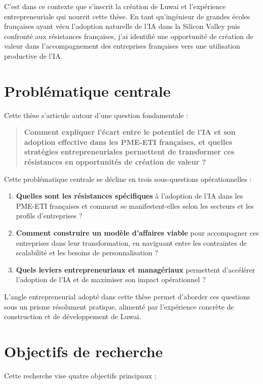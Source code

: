 C'est dans ce contexte que s'inscrit la création de Luwai et l'expérience entrepreneuriale qui nourrit cette thèse. En tant qu'ingénieur de grandes écoles françaises ayant vécu l'adoption naturelle de l'IA dans la Silicon Valley puis confronté aux résistances françaises, j'ai identifié une opportunité de création de valeur dans l'accompagnement des entreprises françaises vers une utilisation productive de l'IA.

\section{Problématique centrale}

Cette thèse s'articule autour d'une question fondamentale :

\begin{quote}
\textbf{Comment expliquer l'écart entre le potentiel de l'IA et son adoption effective dans les PME-ETI françaises, et quelles stratégies entrepreneuriales permettent de transformer ces résistances en opportunités de création de valeur ?}
\end{quote}

Cette problématique centrale se décline en trois sous-questions opérationnelles :

\begin{enumerate}
    \item \textbf{Quelles sont les résistances spécifiques} à l'adoption de l'IA dans les PME-ETI françaises et comment se manifestent-elles selon les secteurs et les profils d'entreprises ?
    \item \textbf{Comment construire un modèle d'affaires viable} pour accompagner ces entreprises dans leur transformation, en naviguant entre les contraintes de scalabilité et les besoins de personnalisation ?
    \item \textbf{Quels leviers entrepreneuriaux et managériaux} permettent d'accélérer l'adoption de l'IA et de maximiser son impact opérationnel ?
\end{enumerate}

L'angle entrepreneurial adopté dans cette thèse permet d'aborder ces questions sous un prisme résolument pratique, alimenté par l'expérience concrète de construction et de développement de Luwai.

\section{Objectifs de recherche}

Cette recherche vise quatre objectifs principaux :

